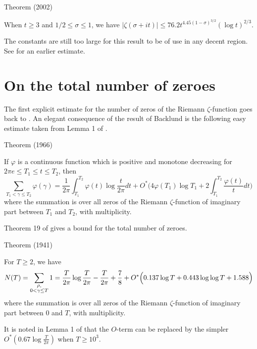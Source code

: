 \begin{thm}{Theorem (2002)}

  When $t\ge 3$ and $1/2\le \sigma\le 1$, we have $|\zeta(\sigma+it)|\le 76.2
  t^{4.45(1-\sigma)^{3/2} } (\log t)^{2/3}$.
\end{thm}

The constants are still too large for this result to be of use in any decent
region. See \cite{Kulas*94} for an
earlier estimate.






\section{On the total number of zeroes
}


The first explicit estimate for the number of zeros of the Riemann
$\zeta$-function goes back to
\cite{Backlund*14}.
An elegant consequence of the result of Backlund is the following easy
estimate taken from Lemma 1 of
\cite{Lehman*66a}.

\begin{thm}{Theorem (1966)}

If $\varphi$ is a continuous function which is positive and monotone
decreasing for $2\pi e\le T_1\le t\le T_2$, then
$$
\sum_{T_1 < \gamma\le T_2} \varphi(\gamma)
            =\frac{1}{2\pi}\int_{T_1}^{T_2}\varphi(t)\log\frac{t}{2\pi}dt
            +O^*\biggl(4\varphi(T_1)\log
            T_1+2\int_{T_1}^{T_2}\frac{\varphi(t)}{t}
            dt\biggr)
            $$
             where the summation is over all zeros of the Riemann
            $\zeta$-function of
            imaginary part between $T_1$ and $T_2$, with multiplicity.
\end{thm}


Theorem 19 of
\cite{Rosser*41}
gives a bound for the total number of zeroes.

\begin{thm}{Theorem (1941)}

For $T\ge2$, we have
$$
N(T)=\sum_{\substack{\rho,\\ 0 < \gamma\le T}} 1=
            \frac{T}{2\pi}\log\frac{T}{2\pi}-\frac{T}{2\pi}+\frac{7}{8}
            +O^*\Bigl(0.137\log T+0.443\log\log T+1.588
            \Bigr)
            $$
            where the summation is over all zeros of the Riemann
            $\zeta$-function of
            imaginary part between 0 and $T$, with multiplicity.
\end{thm}


It is noted in Lemma 1 of
\cite{Ramare-Saouter*02}
that the $O$-term can be replaced by the simpler
$O^*(0.67\log\frac{T}{2\pi})$ when $T\ge 10^3$.

